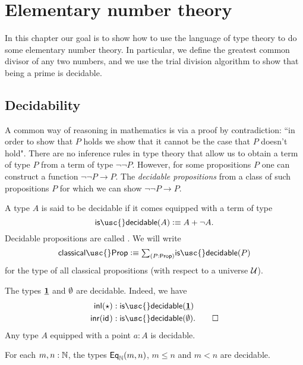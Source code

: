 \section{Elementary number theory}

In this chapter our goal is to show how to use the language of type theory to do some elementary number theory. In particular, we define the greatest common divisor of any two numbers, and we use the trial division algorithm to show that being a prime is decidable.

\subsection{Decidability}

A common way of reasoning in mathematics is via a proof by contradiction: ``in order to show that $P$ holds we show that it cannot be the case that $P$ doesn't hold". There are no inference rules in type theory that allow us to obtain a term of type $P$ from a term of type $\neg\neg P$. However, for some propositions $P$ one can construct a function $\neg\neg P \to P$. The \emph{decidable propositions} from a class of such propositions $P$ for which we can show $\neg\neg P \to P$.

\begin{defn}
  A type $A$ is said to be decidable if it comes equipped with a term of type
  \begin{equation*}
    \mathsf{is\usc{}decidable}(A)\defeq A+\neg A.
  \end{equation*}
  Decidable propositions are called . We will write
  \begin{equation*}
    \mathsf{classical\usc{}Prop} \defeq \sm{P:\mathsf{Prop}}\mathsf{is\usc{}decidable}(P)
  \end{equation*}
  for the type of all classical propositions (with respect to a universe $\mathcal{U}$).
\end{defn}

\begin{eg}
  The types $\underline{\mathbf{1}}$ and $\emptyset$ are decidable. Indeed, we have
  \begin{align*}
    \inl(\ttt) & :\mathsf{is\usc{}decidable}(\unit) \\
    \inr(\idfunc) & : \mathsf{is\usc{}decidable}(\emptyt).\qedhere
  \end{align*}
  Any type $A$ equipped with a point $a:A$ is decidable.
\end{eg}

\begin{lem}
  For each $m,n:{\mathbb{N}}$, the types $\mathsf{Eq}_{{\mathbb{N}}}(m,n)$, $m\leq n$ and $m<n$ are decidable.
\end{lem}

